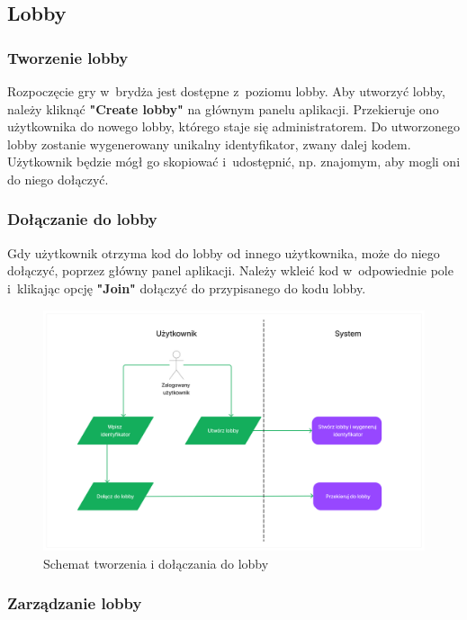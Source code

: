 \FloatBarrier

\subsection{Lobby}
\subsubsection{Tworzenie lobby}

Rozpoczęcie gry w~brydża jest dostępne z~poziomu lobby. Aby utworzyć
lobby, należy kliknąć \textbf{"Create lobby"} na głównym panelu
aplikacji. Przekieruje ono użytkownika do nowego lobby, którego staje
się administratorem. Do utworzonego lobby zostanie wygenerowany
unikalny identyfikator, zwany dalej kodem. Użytkownik będzie mógł go skopiować
i~udostępnić, np. znajomym, aby mogli oni do niego dołączyć.

\subsubsection{Dołączanie do lobby}

Gdy użytkownik otrzyma kod do lobby od innego użytkownika, może
do niego dołączyć, poprzez główny panel aplikacji. Należy wkleić
kod w~odpowiednie pole i~klikając opcję \textbf{"Join"}
dołączyć do przypisanego do kodu lobby.

\begin{figure}[h]
  \centering
  \includegraphics[width=\textwidth]{img/schematy/create_join_lobby.png}
  \caption{Schemat tworzenia i dołączania do lobby}
\end{figure}

\FloatBarrier

\subsubsection{Zarządzanie lobby}

